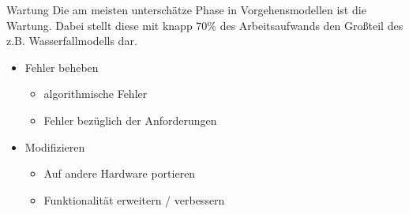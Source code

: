 \begin{bonus}{Wartung}
    Die am meisten unterschätze Phase in Vorgehensmodellen ist die Wartung.
    Dabei stellt diese mit knapp 70\% des Arbeitsaufwands den Großteil des z.B. Wasserfallmodells dar.

    \begin{itemize}
        \item Fehler beheben
              \begin{itemize}
                  \item algorithmische Fehler
                  \item Fehler bezüglich der Anforderungen
              \end{itemize}
        \item Modifizieren
              \begin{itemize}
                  \item Auf andere Hardware portieren
                  \item Funktionalität erweitern / verbessern
              \end{itemize}
    \end{itemize}
\end{bonus}

